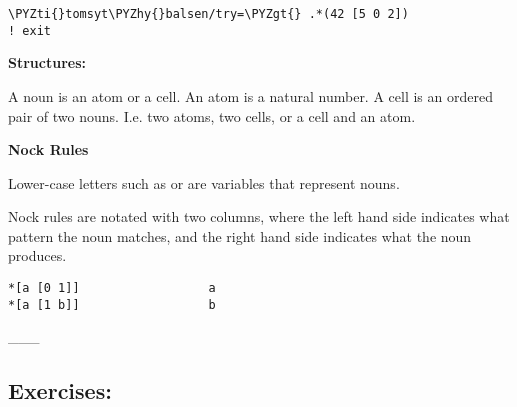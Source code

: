 \begin{framed_shaded}
\begin{Verbatim}[fontsize=\relsize{-2.5},fontseries=b,commandchars=\\\{\}]
\PYZti{}tomsyt\PYZhy{}balsen/try=\PYZgt{} .*(42 [5 0 2]) 
! exit
\end{Verbatim}
\end{framed_shaded}

\textbf{Structures:}

A noun is an atom or a cell.  An atom is a natural number.  A cell is an
ordered pair of two nouns. I.e. two atoms, two cells, or a cell and an atom.

\textbf{Nock Rules}

Lower-case letters such as  or  are variables that represent nouns. 

Nock rules are notated with two columns, where the left hand side indicates
what pattern the noun matches, and the right hand side indicates what the noun
produces.
\begin{framed_shaded}
\begin{Verbatim}[fontsize=\relsize{-2.5},fontseries=b,commandchars=\\\{\}]
*[a [0 1]]                  a
*[a [1 b]]                  b
\end{Verbatim}
\end{framed_shaded}
\_\_\_

\subsection{Exercises:}

